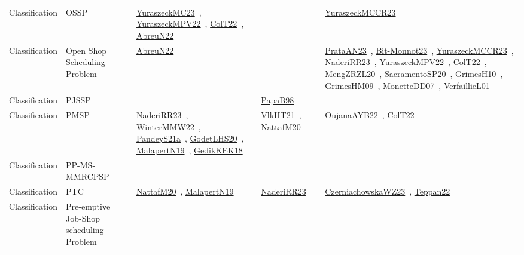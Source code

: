 {\begin{longtable}{lp{3cm}>{\raggedright\arraybackslash}p{6cm}>{\raggedright\arraybackslash}p{6cm}>{\raggedright\arraybackslash}p{8cm}}
Classification & OSSP & \href{papers/YuraszeckMC23.pdf}{YuraszeckMC23}~\cite{YuraszeckMC23}, \href{articles/YuraszeckMPV22.pdf}{YuraszeckMPV22}~\cite{YuraszeckMPV22}, \href{articles/ColT22.pdf}{ColT22}~\cite{ColT22}, \href{articles/AbreuN22.pdf}{AbreuN22}~\cite{AbreuN22} &  & \href{articles/YuraszeckMCCR23.pdf}{YuraszeckMCCR23}~\cite{YuraszeckMCCR23}\\
Classification & Open Shop Scheduling Problem & \href{articles/AbreuN22.pdf}{AbreuN22}~\cite{AbreuN22} &  & \href{articles/PrataAN23.pdf}{PrataAN23}~\cite{PrataAN23}, \href{papers/Bit-Monnot23.pdf}{Bit-Monnot23}~\cite{Bit-Monnot23}, \href{articles/YuraszeckMCCR23.pdf}{YuraszeckMCCR23}~\cite{YuraszeckMCCR23}, \href{articles/NaderiRR23.pdf}{NaderiRR23}~\cite{NaderiRR23}, \href{articles/YuraszeckMPV22.pdf}{YuraszeckMPV22}~\cite{YuraszeckMPV22}, \href{articles/ColT22.pdf}{ColT22}~\cite{ColT22}, \href{articles/MengZRZL20.pdf}{MengZRZL20}~\cite{MengZRZL20}, \href{articles/SacramentoSP20.pdf}{SacramentoSP20}~\cite{SacramentoSP20}, \href{papers/GrimesH10.pdf}{GrimesH10}~\cite{GrimesH10}, \href{papers/GrimesHM09.pdf}{GrimesHM09}~\cite{GrimesHM09}, \href{papers/MonetteDD07.pdf}{MonetteDD07}~\cite{MonetteDD07}, \href{papers/VerfaillieL01.pdf}{VerfaillieL01}~\cite{VerfaillieL01}\\
Classification & PJSSP &  & \href{articles/PapaB98.pdf}{PapaB98}~\cite{PapaB98} & \\
Classification & PMSP & \href{articles/NaderiRR23.pdf}{NaderiRR23}~\cite{NaderiRR23}, \href{papers/WinterMMW22.pdf}{WinterMMW22}~\cite{WinterMMW22}, \href{articles/PandeyS21a.pdf}{PandeyS21a}~\cite{PandeyS21a}, \href{papers/GodetLHS20.pdf}{GodetLHS20}~\cite{GodetLHS20}, \href{papers/MalapertN19.pdf}{MalapertN19}~\cite{MalapertN19}, \href{articles/GedikKEK18.pdf}{GedikKEK18}~\cite{GedikKEK18} & \href{articles/VlkHT21.pdf}{VlkHT21}~\cite{VlkHT21}, \href{papers/NattafM20.pdf}{NattafM20}~\cite{NattafM20} & \href{papers/OujanaAYB22.pdf}{OujanaAYB22}~\cite{OujanaAYB22}, \href{articles/ColT22.pdf}{ColT22}~\cite{ColT22}\\
Classification & PP-MS-MMRCPSP &  &  & \\
Classification & PTC & \href{papers/NattafM20.pdf}{NattafM20}~\cite{NattafM20}, \href{papers/MalapertN19.pdf}{MalapertN19}~\cite{MalapertN19} & \href{articles/NaderiRR23.pdf}{NaderiRR23}~\cite{NaderiRR23} & \href{articles/CzerniachowskaWZ23.pdf}{CzerniachowskaWZ23}~\cite{CzerniachowskaWZ23}, \href{papers/Teppan22.pdf}{Teppan22}~\cite{Teppan22}\\
Classification & Pre-emptive Job-Shop scheduling Problem &  &  & \\

\end{longtable}}
